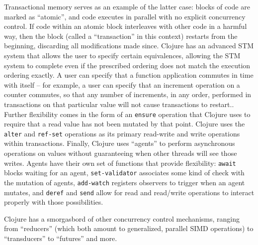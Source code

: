 Transactional memory serves as an example of the latter case: blocks of code are
marked as ``atomic'', and code executes in parallel with no explicit concurrency
control. If code within an atomic block interleaves with other code in a harmful
way, then the block (called a ``transaction'' in this context) restarts from the
beginning, discarding all modifications made since. Clojure has an advanced STM
system that allows the user to specify certain equivalences, allowing the STM
system to complete even if the prescribed ordering does not match the execution
ordering exactly. A user can specify that a function application commutes in time
with itself -- for example, a user can specify that an increment operation on a
counter commutes, so that any number of increments, in any order, performed in
transactions on that particular value will not cause transactions to restart.. Further
flexibility comes in the form of an \texttt{ensure} operation that Clojure uses to
require that a read value has not been mutated by that point. Clojure uses the
\texttt{alter} and \texttt{ref-set} operations as its primary read-write and write
operations within transactions. Finally, Clojure uses ``agents'' to perform
asynchronous operations on values without guaranteeing when other threads will
see those writes. Agents have their own set of functions that provide
flexibility: \texttt{await} blocks waiting for an agent, \texttt{set-validator}
associates some kind of check with the mutation of agents, \texttt{add-watch}
registers observers to trigger when an agent mutates, and \texttt{deref} and
\texttt{send} allow for read and read/write operations to interact properly with
those possibilities.

Clojure has a smorgasbord of other concurrency control mechanisms, ranging from
``reducers'' (which both amount to generalized, parallel SIMD operations) to
``transducers'' to ``futures'' and more.

